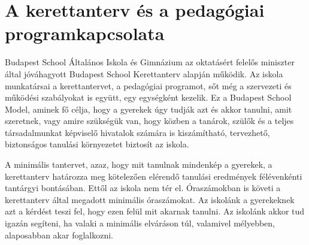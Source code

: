 \section{A kerettanterv és a pedagógiai program\hfill\break  kapcsolata}
\label{sec:tanterv-program}
Budapest School Általános Iskola és Gimnázium az oktatásért felelős miniszter által jóváhagyott Budapest School Kerettanterv alapján működik. Az iskola munkatársai a kerettantervet, a pedagógiai programot, sőt még a szervezeti és működési szabályokat is együtt, egy egységként kezelik. Ez a Budapest School Model, aminek fő célja, hogy a gyerekek úgy tudják azt és akkor tanulni, amit szeretnek, vagy amire szükségük van, hogy közben a tanárok, szülők és a teljes társadalmunkat képviselő hivatalok számára is kiszámítható, tervezhető, biztonságos tanulási környezetet biztosít az iskola.

A minimális tantervet, azaz, hogy mit tanulnak mindenkép a gyerekek, a kerettanterv határozza meg kötelezően elérendő tanulási eredmények félévenkénti tantárgyi bontásában. Ettől az iskola nem tér el. Óraszámokban is követi a kerettanterv által megadott minimális óraszámokat. Az iskolánk a gyerekeknek azt a kérdést teszi fel, hogy ezen felül mit akarnak tanulni. Az iskolánk akkor tud igazán segíteni, ha valaki a minimális elváráson túl, valamivel mélyebben, alaposabban akar foglalkozni.
